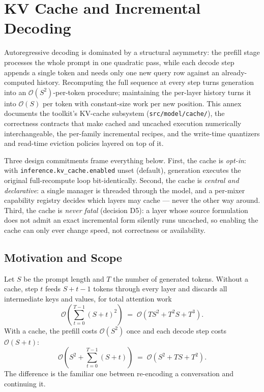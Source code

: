 \section{KV Cache and Incremental Decoding}
\label{sec:annex-kv-cache}

Autoregressive decoding is dominated by a structural asymmetry: the prefill stage processes the whole prompt in one quadratic pass, while each decode step appends a single token and needs only one new query row against an already-computed history. Recomputing the full sequence at every step turns generation into an $\mathcal{O}(S^2)$-per-token procedure; maintaining the per-layer history turns it into $\mathcal{O}(S)$ per token with constant-size work per new position. This annex documents the toolkit's KV-cache subsystem (\texttt{src/model/cache/}), the correctness contracts that make cached and uncached execution numerically interchangeable, the per-family incremental recipes, and the write-time quantizers and read-time eviction policies layered on top of it.

Three design commitments frame everything below. First, the cache is \emph{opt-in}: with \texttt{inference.kv\_cache.enabled} unset (default), generation executes the original full-recompute loop bit-identically. Second, the cache is \emph{central and declarative}: a single manager is threaded through the model, and a per-mixer capability registry decides which layers may cache --- never the other way around. Third, the cache is \emph{never fatal} (decision D5): a layer whose source formulation does not admit an exact incremental form silently runs uncached, so enabling the cache can only ever change speed, not correctness or availability.

\subsection{Motivation and Scope}

Let $S$ be the prompt length and $T$ the number of generated tokens. Without a cache, step $t$ feeds $S+t-1$ tokens through every layer and discards all intermediate keys and values, for total attention work
\[
\mathcal{O}\!\left(\sum_{t=0}^{T-1} (S+t)^2\right) \;=\; \mathcal{O}\!\left(T S^2 + T^2 S + T^3\right).
\]
With a cache, the prefill costs $\mathcal{O}(S^2)$ once and each decode step costs $\mathcal{O}(S+t)$:
\[
\mathcal{O}\!\left(S^2 + \sum_{t=0}^{T-1}(S+t)\right) \;=\; \mathcal{O}\!\left(S^2 + TS + T^2\right).
\]
The difference is the familiar one between re-encoding a conversation and continuing it.

